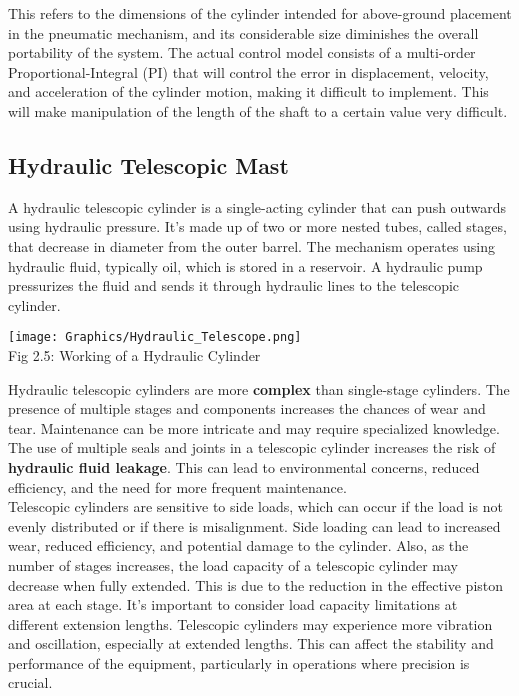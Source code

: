 \documentclass[a4,10pt]{report}
\begin{document}
\par This refers to the dimensions of the cylinder intended for above-ground placement in the pneumatic mechanism, and its considerable size diminishes the overall portability of the system.\cite{pneumatic_size_1,pneumatic_size_2} The actual control model consists of a multi-order Proportional-Integral (PI) that will control the error in displacement, velocity, and acceleration of the cylinder motion, making it difficult to implement. This will make manipulation of the length of the shaft to a certain value very difficult.

\subsection{Hydraulic Telescopic Mast}
A hydraulic telescopic cylinder is a single-acting cylinder that can push outwards using hydraulic pressure. It's made up of two or more nested tubes, called stages, that decrease in diameter from the outer barrel. The mechanism operates using hydraulic fluid, typically oil, which is stored in a reservoir. A hydraulic pump pressurizes the fluid and sends it through hydraulic lines to the telescopic cylinder.\cite{hydraulic}
\begin{center}
    \texttt{[image: Graphics/Hydraulic\_Telescope.png]} \\
    Fig 2.5: Working of a Hydraulic Cylinder \\
\end{center}
Hydraulic telescopic cylinders are more \textbf{complex} than single-stage cylinders. The presence of multiple stages and components increases the chances of wear and tear. Maintenance can be more intricate and may require specialized knowledge. The use of multiple seals and joints in a telescopic cylinder increases the risk of \textbf{hydraulic fluid leakage}. This can lead to environmental concerns, reduced efficiency, and the need for more frequent maintenance. 
\vspace{2mm} \\
Telescopic cylinders are sensitive to side loads, which can occur if the load is not evenly distributed or if there is misalignment. Side loading can lead to increased wear, reduced efficiency, and potential damage to the cylinder. Also, as the number of stages increases, the load capacity of a telescopic cylinder may decrease when fully extended. This is due to the reduction in the effective piston area at each stage. It's important to consider load capacity limitations at different extension lengths. Telescopic cylinders may experience more vibration and oscillation, especially at extended lengths. This can affect the stability and performance of the equipment, particularly in operations where precision is crucial.
\end{document}
